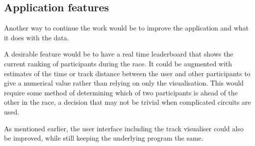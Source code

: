 \subsection*{Application features}
Another way to continue the work would be to improve the application and what it does with the data.

A desirable feature would be to have a real time leaderboard that shows the current ranking of participants during the race. It could be augmented with estimates of the time or track distance between the user and other participants to give a numerical value rather than relying on only the visualisation. This would require some method of determining which of two participants is ahead of the other in the race, a decision that may not be trivial when complicated circuits are used.

As mentioned earlier, the user interface including the track visualiser could also be improved, while still keeping the underlying program the same.

\cleardoublepage



